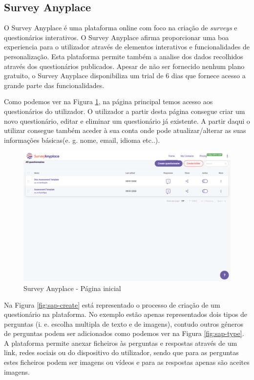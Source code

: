 \subsection{Survey Anyplace}
\label{surveyanyplaceM}



O Survey Anyplace é uma plataforma online com foco na criação de \textit{surveys} e questionários interativos. O Survey Anyplace afirma proporcionar uma boa experiencia para o utilizador através de elementos interativos e funcionalidades de personalização. Esta plataforma permite também a analise dos dados recolhidos através dos questionários publicados. Apesar de não ser fornecido nenhum plano gratuito, o Survey Anyplace disponibiliza um trial de 6 dias que fornece acesso a grande parte das funcionalidades.

Como podemos ver na Figura \ref{fig:sap-dash}, na página principal temos acesso aos questionários do utilizador. O utilizador a partir desta página consegue criar um novo questionário, editar e eliminar um questionário já existente. A partir daqui o utilizar consegue também aceder à sua conta onde pode atualizar/alterar as suas informações básicas(e. g. nome, email, idioma etc..). 


\begin{figure}[ht!]
	\begin{center}
		\includegraphics[width=1\textwidth]{img/sap/dash}
		\caption{Survey Anyplace - Página inicial}
		\label{fig:sap-dash}
	\end{center}
\end{figure}

Na Figura \ref{fig:sap-create} está representado o processo de criação de um questionário na plataforma. No exemplo estão apenas representados dois tipos de perguntas (i. e. escolha multipla de texto e de imagens), contudo outros géneros de perguntas podem ser adicionados como podemos ver na Figura \ref{fig:sap-type}. A plataforma permite anexar ficheiros às perguntas e respostas através de um link, redes sociais ou do dispositivo do utilizador, sendo que para as perguntas estes ficheiros podem ser imagens ou vídeos e para as respostas apenas são aceites imagens.


